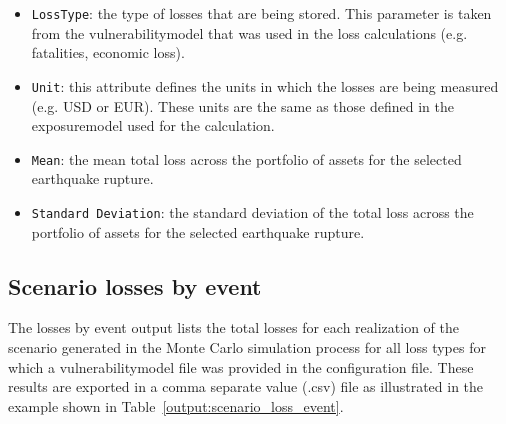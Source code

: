 \begin{itemize}

  \item \Verb+LossType+: the type of losses that are being stored. This
    parameter is taken from the \gls{vulnerabilitymodel} that was used in the
    loss calculations (e.g. fatalities, economic loss).

  \item \Verb+Unit+: this attribute defines the units in which the losses are
    being measured (e.g. USD or EUR). These units are the same as those defined
    in the \gls{exposuremodel} used for the calculation.

  \item \Verb+Mean+: the mean total loss across the portfolio of assets for the
    selected earthquake rupture.

  \item \Verb+Standard Deviation+: the standard deviation of the total loss 
    across the portfolio of assets for the selected earthquake rupture.

\end{itemize}


\subsection{Scenario losses by event}
\label{subsec:scenario_losses_event}

The losses by event output lists the total losses for each realization of the
scenario generated in the Monte Carlo simulation process for all loss types
for which a \gls{vulnerabilitymodel} file was provided in the configuration
file. These results are exported in a comma separate value (.csv) file as
illustrated in the example shown in Table~\ref{output:scenario_loss_event}.


